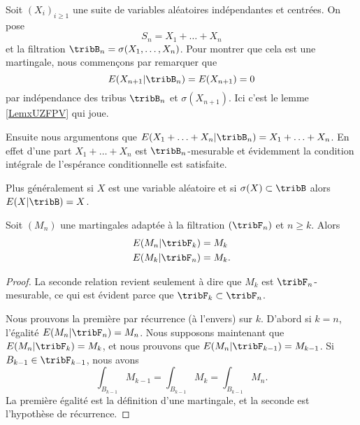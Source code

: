 \begin{example}     \label{ExtFFKTr}
    Soit \( (X_i)_{i\geq 1}\) une suite de variables aléatoires indépendantes et centrées. On pose
    \begin{equation}
        S_n=X_1+\ldots +X_n
    \end{equation}
    et la filtration \( \tribB_n=\sigma(X_1,\ldots, X_n)\). Pour montrer que cela est une martingale, nous commençons par remarquer que
    \begin{equation}
        E(X_{n+1}|\tribB_n)=E(X_{n+1})=0
    \end{equation}
    par indépendance des tribus \( \tribB_n\) et \( \sigma(X_{n+1})\). Ici c'est le lemme \ref{LemxUZFPV} qui joue.

    Ensuite nous argumentons que \( E(X_1+\ldots +X_n|\tribB_n)=X_1+\ldots +X_n\). En effet d'une part \( X_1+\ldots +X_n\) est \( \tribB_n\)-mesurable et évidemment la condition intégrale de l'espérance conditionnelle est satisfaite.

    Plus généralement si \( X\) est une variable aléatoire et si \( \sigma(X)\subset\tribB\) alors \( E(X|\tribB)=X\).
\end{example}

\begin{lemma}   \label{LemqanhgJ}
    Soit \( (M_n)\) une martingales adaptée à la filtration \( (\tribF_n)\) et \( n\geq k\). Alors
    \begin{subequations}
        \begin{align}
            E(M_n|\tribF_k)&=M_k\\
            E(M_k|\tribF_n)&=M_k.
        \end{align}
    \end{subequations}
\end{lemma}

\begin{proof}
    La seconde relation revient seulement à dire que \( M_k\) est \( \tribF_n\)-mesurable, ce qui est évident parce que \( \tribF_k\subset\tribF_n\).

    Nous prouvons la première par récurrence (à l'envers) sur \( k\). D'abord si \( k=n\), l'égalité \( E(M_n|\tribF_n)=M_n\). Nous supposons maintenant que \( E(M_n|\tribF_k)=M_k\), et nous prouvons que \( E(M_n|\tribF_{k-1})=M_{k-1}\). Si \( B_{k-1}\in \tribF_{k-1}\), nous avons
    \begin{equation}
        \int_{B_{k-1}}M_{k-1}=\int_{B_{k-1}}M_{k}=\int_{B_{k-1}}M_n.
    \end{equation}
    La première égalité est la définition d'une martingale, et la seconde est l'hypothèse de récurrence.
\end{proof}


